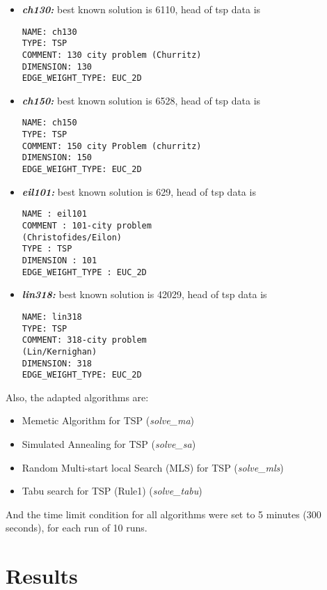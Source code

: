 \documentclass[conference]{IEEEtran}
\begin{document}
    \begin{itemize}
        \item \textit{\textbf{ch130:}} best known solution is 6110, head of tsp data is
        \begin{verbatim}
NAME: ch130
TYPE: TSP
COMMENT: 130 city problem (Churritz)
DIMENSION: 130
EDGE_WEIGHT_TYPE: EUC_2D
        \end{verbatim}
        \item \textit{\textbf{ch150:}} best known solution is 6528, head of tsp data is
        \begin{verbatim}
NAME: ch150
TYPE: TSP
COMMENT: 150 city Problem (churritz)
DIMENSION: 150
EDGE_WEIGHT_TYPE: EUC_2D
        \end{verbatim}
        \item \textit{\textbf{eil101:}} best known solution is 629, head of tsp data is
        \begin{verbatim}
NAME : eil101
COMMENT : 101-city problem 
(Christofides/Eilon)
TYPE : TSP
DIMENSION : 101
EDGE_WEIGHT_TYPE : EUC_2D
        \end{verbatim}
        \item \textit{\textbf{lin318:}} best known solution is 42029, head of tsp data is
        \begin{verbatim}
NAME: lin318
TYPE: TSP
COMMENT: 318-city problem 
(Lin/Kernighan)
DIMENSION: 318
EDGE_WEIGHT_TYPE: EUC_2D
        \end{verbatim}

    \end{itemize}

    Also, the adapted algorithms are:

    \begin{itemize}
        \item Memetic Algorithm for TSP (\textit{solve\_ma})
        \item Simulated Annealing for TSP (\textit{solve\_sa})
        \item Random Multi-start local Search (MLS) for TSP (\textit{solve\_mls})
        \item Tabu search for TSP (Rule1) (\textit{solve\_tabu})
    \end{itemize}

    And the time limit condition for all algorithms were set to 5 minutes (300 seconds), for each run of 10 runs.


    \section{Results}
\end{document}
